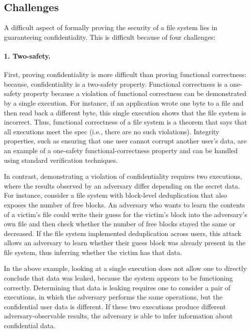 \subsection{Challenges}
\label{s:goal:chal}

A difficult aspect of formally proving the security of a file system lies
in guaranteeing confidentiality.  This is difficult because of four challenges:

\paragraph{1. Two-safety.}
First, proving confidentiality is more difficult than
proving functional correctness: because, confidentiality
is a two-safety property.  Functional correctness is a one-safety
property because a violation of functional correctness can be demonstrated
by a single execution.  For instance, if an application wrote one byte to
a file and then read back a different byte, this single execution shows
that the file system is incorrect.  Thus, functional correctness
of a file system is a theorem that says that all executions meet the
spec (i.e., there are no such violations).  Integrity properties,
such as ensuring that one user cannot corrupt another user's data,
are an example of a one-safety functional-correctness property and can
be handled using standard verification techniques.

In contrast, demonstrating a violation of confidentiality requires
two executions, where the results observed by an adversary differ depending on
the secret data.
For instance, consider a file system with block-level deduplication that
also exposes the number of free blocks.  An adversary who wants to
learn the contents of a victim's file could write their guess for the
victim's block into the adversary's own file and then check whether
the number of free blocks stayed the same or decreased.  If the file
system implemented deduplication across users, this attack allows an
adversary to learn whether their guess block was already present in the
file system, thus inferring whether the victim has that data.

In the above example, looking at a single execution does not allow one
to directly conclude that data was leaked, because the system appears
to be functioning correctly.  Determining that data is leaking requires
one to consider a pair of executions, in which the adversary performs
the same operations, but the confidential user data is different.
If these two executions produce different adversary-observable results,
the adversary is able to infer information about confidential data.

